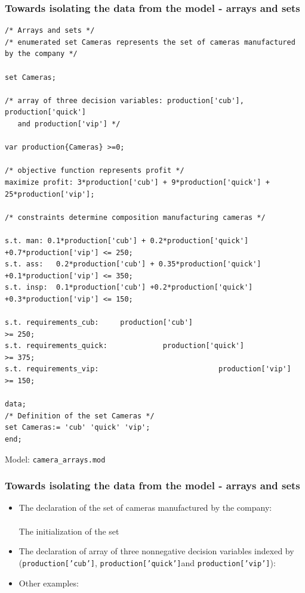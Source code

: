 \documentclass[landscape]{beamer}
\begin{document}
\begin{frame}[fragile]
  \frametitle{Towards isolating  the data from the model - arrays and sets } 
\begin{tiny}
\begin{verbatim}
/* Arrays and sets */
/* enumerated set Cameras represents the set of cameras manufactured by the company */

set Cameras; 

/* array of three decision variables: production['cub'], production['quick'] 
   and production['vip'] */

var production{Cameras} >=0;

/* objective function represents profit */
maximize profit: 3*production['cub'] + 9*production['quick'] + 25*production['vip'];

/* constraints determine composition manufacturing cameras */

s.t. man: 0.1*production['cub'] + 0.2*production['quick']   +0.7*production['vip'] <= 250;   
s.t. ass:   0.2*production['cub'] + 0.35*production['quick'] +0.1*production['vip'] <= 350;
s.t. insp:  0.1*production['cub'] +0.2*production['quick']    +0.3*production['vip'] <= 150;

s.t. requirements_cub:     production['cub']                         >= 250;
s.t. requirements_quick:             production['quick']             >= 375;
s.t. requirements_vip:                            production['vip']  >= 150;

data;
/* Definition of the set Cameras */
set Cameras:= 'cub' 'quick' 'vip';
end;
\end{verbatim}
\end{tiny}
Model:  \verb=camera_arrays.mod=
\end{frame} 
\begin{frame}[fragile]
  \frametitle{Towards isolating  the data from the model - arrays and sets } 
\begin{itemize}
\item The declaration of the \alert{set} of cameras manufactured by the company:\\
         \texttt{}\\
         The initialization of the set \texttt{}\\
          \texttt{}
\item  The declaration of  \alert{array} of three nonnegative decision variables indexed by \texttt{}
          (\texttt{production['cub']}, \texttt{production['quick']}and \texttt{production['vip']}):\\
           \texttt{} 
\item Other examples:\\
          \texttt{}\\
          \texttt{}\\   
          \texttt{}    
\end{itemize}  
  
\end{frame}  
\end{document}

